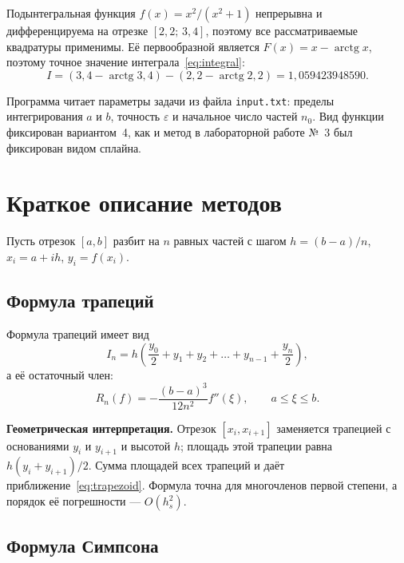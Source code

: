 \documentclass[14pt,a4paper]{extarticle}
\begin{document}
Подынтегральная функция $f(x)=x^2/(x^2+1)$ непрерывна и дифференцируема
на отрезке $[2,2;\,3,4]$, поэтому все рассматриваемые квадратуры
применимы. Её первообразной является $F(x)=x-\operatorname{arctg}x$,
поэтому точное значение интеграла~\eqref{eq:integral}:
\begin{equation}
    I=(3,4-\operatorname{arctg}3,4)-(2,2-\operatorname{arctg}2,2)
      =1{,}059423948590 .
    \label{eq:exact}
\end{equation}

Программа читает параметры задачи из файла \texttt{input.txt}: пределы
интегрирования $a$ и $b$, точность $\varepsilon$ и начальное число
частей $n_0$. Вид функции фиксирован вариантом~4, как и метод
в лабораторной работе №~3 был фиксирован видом сплайна.

\section{Краткое описание методов}

Пусть отрезок $[a,b]$ разбит на $n$ равных частей с шагом
$h=(b-a)/n$, $x_i=a+ih$, $y_i=f(x_i)$.

\subsection{Формула трапеций}

Формула трапеций имеет вид
\begin{equation}
    I_n=h\left(\frac{y_0}{2}+y_1+y_2+\ldots+y_{n-1}+\frac{y_n}{2}\right),
    \label{eq:trapezoid}
\end{equation}
а её остаточный член:
\begin{equation}
    R_n(f)=-\frac{(b-a)^3}{12n^2}f''(\xi),\qquad a\le \xi\le b .
    \label{eq:trapezoid-error}
\end{equation}

\textbf{Геометрическая интерпретация.} Отрезок $[x_i,x_{i+1}]$ заменяется
трапецией с основаниями $y_i$ и $y_{i+1}$ и высотой $h$; площадь этой
трапеции равна $h(y_i+y_{i+1})/2$. Сумма площадей всех трапеций и даёт
приближение~\eqref{eq:trapezoid}. Формула точна для многочленов первой
степени, а порядок её погрешности --- $O(h_s^2)$.

\subsection{Формула Симпсона}
\end{document}
